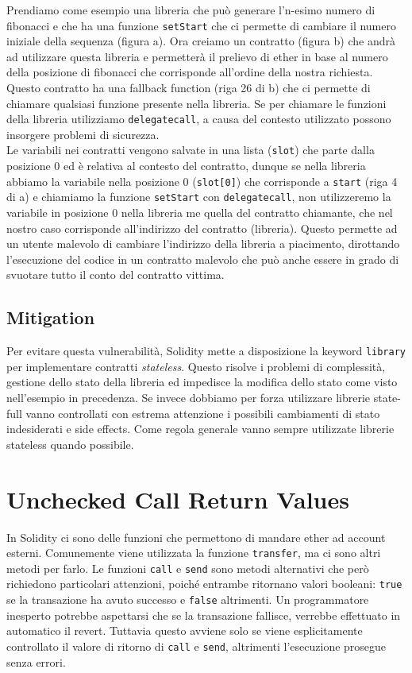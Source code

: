 Prendiamo come esempio una libreria che può generare l'n-esimo numero di fibonacci
e che ha una funzione \verb|setStart| che ci permette di cambiare il numero
iniziale della sequenza (figura a).
Ora creiamo un contratto (figura b) che andrà ad utilizzare questa libreria e
permetterà il prelievo di ether in base al numero della posizione di fibonacci
che corrisponde all'ordine della nostra richiesta.
Questo contratto ha una fallback function (riga 26 di b)
che ci permette di chiamare qualsiasi funzione presente nella libreria.
Se per chiamare le funzioni della libreria utilizziamo \verb|delegatecall|,
a causa del contesto utilizzato possono insorgere problemi di sicurezza.\\
Le variabili nei contratti vengono salvate in una lista (\verb|slot|)
che parte dalla posizione $0$ ed è relativa al contesto del contratto,
dunque se nella libreria abbiamo la variabile nella posizione $0$ (\verb|slot[0]|)
che corrisponde a \verb|start| (riga 4 di a) e chiamiamo la funzione
\verb|setStart| con \verb|delegatecall|, non utilizzeremo la variabile in
posizione $0$ nella libreria me quella del contratto chiamante,
che nel nostro caso corrisponde all'indirizzo del contratto (libreria).
Questo permette ad un utente malevolo di
cambiare l'indirizzo della libreria a piacimento, dirottando l'esecuzione
del codice in un contratto malevolo che può anche essere in grado di svuotare
tutto il conto del contratto vittima.

\subsection{Mitigation}

Per evitare questa vulnerabilità, Solidity mette a disposizione la keyword
\verb|library| per implementare contratti \textit{stateless}.
Questo risolve i problemi di complessità, gestione dello stato della libreria ed
impedisce la modifica dello stato come visto nell'esempio in precedenza.
Se invece dobbiamo per forza utilizzare librerie state-full vanno controllati
con estrema attenzione i possibili cambiamenti di stato indesiderati e side effects.
Come regola generale vanno sempre utilizzate librerie stateless quando possibile.

\section{Unchecked Call Return Values}

In Solidity ci sono delle funzioni che permettono di mandare ether ad account
esterni. Comunemente viene utilizzata la funzione \verb|transfer|, ma ci sono
altri metodi per farlo. Le funzioni \verb|call| e \verb|send| sono metodi
alternativi che però richiedono particolari attenzioni, poiché entrambe
ritornano valori booleani: \verb|true| se la transazione ha avuto successo e
\verb|false| altrimenti. Un programmatore inesperto potrebbe aspettarsi che se
la transazione fallisce, verrebbe effettuato in automatico il revert.
Tuttavia questo avviene solo se viene esplicitamente controllato il valore di
ritorno di \verb|call| e \verb|send|, altrimenti l'esecuzione prosegue senza errori.

